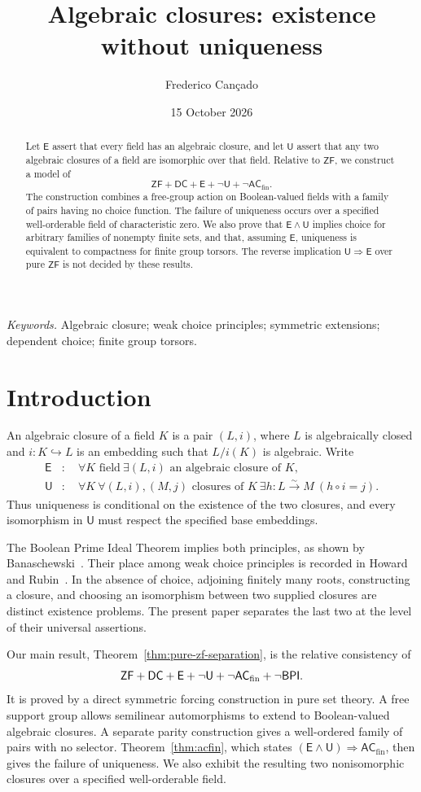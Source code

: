 \documentclass[11pt,a4paper]{article}
\title{Algebraic closures: existence without uniqueness}
\author{Frederico Can\c{c}ado}
\date{15 October 2026}
\theoremstyle{definition}\newtheorem{definition}[theorem]{Definition}
\theoremstyle{remark}\newtheorem{remark}[theorem]{Remark}
\newcommand{\ZF}{\mathsf{ZF}}\newcommand{\ZFA}{\mathsf{ZFA}}
\newcommand{\E}{\mathsf E}\newcommand{\U}{\mathsf U}
\newcommand{\ACfin}{\mathsf{AC}_{\mathrm{fin}}}
\begin{document}
\maketitle
\begin{abstract}
Let $\E$ assert that every field has an algebraic closure, and let $\U$ assert that any two algebraic closures of a field are isomorphic over that field. Relative to $\ZF$, we construct a model of
\[
\ZF+\mathsf{DC}+\E+\neg\U+\neg\ACfin.
\]
The construction combines a free-group action on Boolean-valued fields with a family of pairs having no choice function. The failure of uniqueness occurs over a specified well-orderable field of characteristic zero. We also prove that $\E\wedge\U$ implies choice for arbitrary families of nonempty finite sets, and that, assuming $\E$, uniqueness is equivalent to compactness for finite group torsors. The reverse implication $\U\Rightarrow\E$ over pure $\ZF$ is not decided by these results.
\end{abstract}
\noindent\textit{Keywords.} Algebraic closure; weak choice principles; symmetric extensions; dependent choice; finite group torsors.

\section{Introduction}
An algebraic closure of a field $K$ is a pair $(L,i)$, where $L$ is algebraically closed and $i:K\hookrightarrow L$ is an embedding such that $L/i(K)$ is algebraic. Write
\begin{align*}
\E&:\quad \forall K\text{ field}\ \exists(L,i)\text{ an algebraic closure of }K,\\
\U&:\quad \forall K\ \forall(L,i),(M,j)\text{ closures of }K\ 
\exists h:L\xrightarrow{\sim}M\ (h\circ i=j).
\end{align*}
Thus uniqueness is conditional on the existence of the two closures, and every isomorphism in $\U$ must respect the specified base embeddings.

The Boolean Prime Ideal Theorem implies both principles, as shown by Banaschewski~\cite{Banaschewski}. Their place among weak choice principles is recorded in Howard and Rubin~\cite{HR}. In the absence of choice, adjoining finitely many roots, constructing a closure, and choosing an isomorphism between two supplied closures are distinct existence problems. The present paper separates the last two at the level of their universal assertions.

Our main result, Theorem~\ref{thm:pure-zf-separation}, is the relative consistency of
\[
\ZF+\mathsf{DC}+\E+\neg\U+\neg\ACfin+\neg\BPI.
\]
It is proved by a direct symmetric forcing construction in pure set theory. A free support group allows semilinear automorphisms to extend to Boolean-valued algebraic closures. A separate parity construction gives a well-ordered family of pairs with no selector. Theorem~\ref{thm:acfin}, which states $(\E\wedge\U)\Rightarrow\ACfin$, then gives the failure of uniqueness. We also exhibit the resulting two nonisomorphic closures over a specified well-orderable field.
\end{document}

